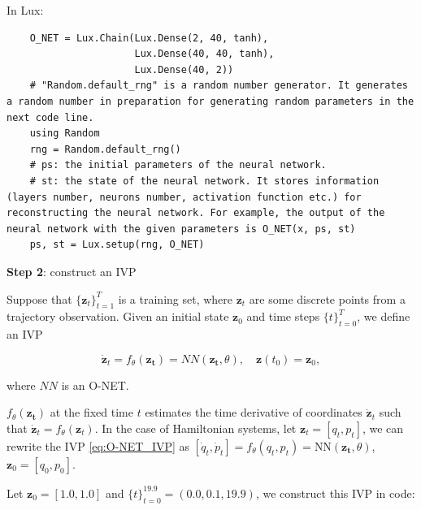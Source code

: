\documentclass[
	parskip, 			   %
	twoside, 			   %
	DIV=14, 			   %
	BCOR=15.0mm, 		   %
	headsepline, 		   %
	open=right, 		   %
	captions=tableheading, %
	bibliography=totoc,    %
	numbers=noenddot       %
]{scrreprt}
\begin{document}
In Lux:
\begin{verbatim}
    O_NET = Lux.Chain(Lux.Dense(2, 40, tanh),
                      Lux.Dense(40, 40, tanh),
                      Lux.Dense(40, 2))
    # "Random.default_rng" is a random number generator. It generates a random number in preparation for generating random parameters in the next code line.
    using Random
    rng = Random.default_rng()
    # ps: the initial parameters of the neural network.
    # st: the state of the neural network. It stores information (layers number, neurons number, activation function etc.) for reconstructing the neural network. For example, the output of the neural network with the given parameters is O_NET(x, ps, st)
    ps, st = Lux.setup(rng, O_NET)
\end{verbatim}

\textbf{Step 2}: construct an IVP

Suppose that $\{ \mathbf{z}_{t} \}_{t=1}^{T}$ is a training set, where $\mathbf{z}_{t}$ are some discrete points from a trajectory observation. Given an initial state $\mathbf{z}_{0}$ and time steps $\{ t \}_{t=0}^{T}$, we define an IVP

\begin{equation}
    \label{eq:O-NET_IVP}
    \dot{\mathbf{z}}_t = f_{\theta}(\mathbf{z_t}) = NN(\mathbf{z_t}, \theta), \quad \mathbf{z}(t_{0}) = \mathbf{z}_{0},
\end{equation}

where $NN$ is an O-NET.

$f_{\theta}(\mathbf{z_t})$ at the fixed time $t$ estimates the time derivative of coordinates $\dot{\mathbf{z}}_{t}$ such that $\dot{ \mathbf{z}}_{t} = f_{\theta}(\mathbf{z}_t)$. In the case of Hamiltonian systems, let $\mathbf{z}_{t} = [q_{t}, p_{t}]$, we can rewrite the IVP \ref{eq:O-NET_IVP} as $[\dot q_{t}, \dot p_{t}] = f_{\theta}(q_t, p_t) = \text{NN}(\mathbf{z_t}, \theta)$, $\mathbf{z}_{0}= [q_{0}, p_{0}]$.

Let $\mathbf{z}_{0}=[1.0, 1.0]$ and $\{ t \}_{t=0}^{19.9} = (0.0, 0.1, 19.9)$, we construct this IVP in code:
\end{document}
